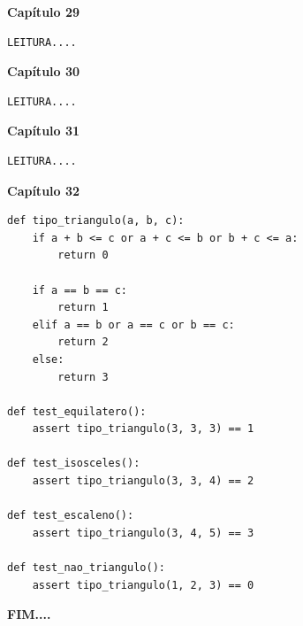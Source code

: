 \documentclass[a4paper,12pt]{article}
\newcommand{\capitulo}[1]{
    \vspace{1em}
    \noindent
    \colorbox{black!15}{
        \parbox{\dimexpr\linewidth-2\fboxsep}{
            \centering \Large \textbf{#1}
        }
    }
    \vspace{1em}
}
\begin{document}
\capitulo{Capítulo 29}
\begin{lstlisting}[style=pythonstyle]
LEITURA....
\end{lstlisting}

\capitulo{Capítulo 30}
\begin{lstlisting}[style=pythonstyle]
LEITURA....
\end{lstlisting}

\capitulo{Capítulo 31}
\begin{lstlisting}[style=pythonstyle]
LEITURA....
\end{lstlisting}

\capitulo{Capítulo 32}
\begin{lstlisting}[style=pythonstyle]
def tipo_triangulo(a, b, c):
    if a + b <= c or a + c <= b or b + c <= a:
        return 0  

    if a == b == c:
        return 1
    elif a == b or a == c or b == c:
        return 2
    else:
        return 3

def test_equilatero():
    assert tipo_triangulo(3, 3, 3) == 1

def test_isosceles():
    assert tipo_triangulo(3, 3, 4) == 2

def test_escaleno():
    assert tipo_triangulo(3, 4, 5) == 3

def test_nao_triangulo():
    assert tipo_triangulo(1, 2, 3) == 0
\end{lstlisting}

\capitulo{FIM....}
\end{document}
